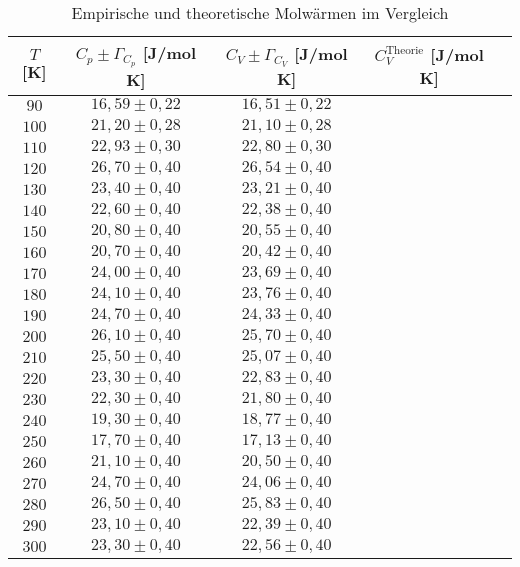 \begin{table}[H]
  \centering
  \begin{tabular}{ccccc}
    \toprule
    $T$ [K] & $C_p \pm \Gamma_{C_p} $ [J/mol K]
    & $C_V \pm \Gamma_{C_V} $ [J/mol K] & $C_{V}^{\text{Theorie}}$ [J/mol K] \\
    \midrule
    $ 90$ & $16,59 \pm 0,22$ & $16,51 \pm 0,22$ &  \\
    $100$ & $21,20 \pm 0,28$ & $21,10 \pm 0,28$ &  \\
    $110$ & $22,93 \pm 0,30$ & $22,80 \pm 0,30$ &  \\
    $120$ & $26,70 \pm 0,40$ & $26,54 \pm 0,40$ &  \\
    $130$ & $23,40 \pm 0,40$ & $23,21 \pm 0,40$ &  \\
    $140$ & $22,60 \pm 0,40$ & $22,38 \pm 0,40$ &  \\
    $150$ & $20,80 \pm 0,40$ & $20,55 \pm 0,40$ &  \\
    $160$ & $20,70 \pm 0,40$ & $20,42 \pm 0,40$ &  \\
    $170$ & $24,00 \pm 0,40$ & $23,69 \pm 0,40$ &  \\
    $180$ & $24,10 \pm 0,40$ & $23,76 \pm 0,40$ &  \\
    $190$ & $24,70 \pm 0,40$ & $24,33 \pm 0,40$ &  \\
    $200$ & $26,10 \pm 0,40$ & $25,70 \pm 0,40$ &  \\
    $210$ & $25,50 \pm 0,40$ & $25,07 \pm 0,40$ &  \\
    $220$ & $23,30 \pm 0,40$ & $22,83 \pm 0,40$ &  \\
    $230$ & $22,30 \pm 0,40$ & $21,80 \pm 0,40$ &  \\
    $240$ & $19,30 \pm 0,40$ & $18,77 \pm 0,40$ &  \\
    $250$ & $17,70 \pm 0,40$ & $17,13 \pm 0,40$ &  \\
    $260$ & $21,10 \pm 0,40$ & $20,50 \pm 0,40$ &  \\
    $270$ & $24,70 \pm 0,40$ & $24,06 \pm 0,40$ &  \\
    $280$ & $26,50 \pm 0,40$ & $25,83 \pm 0,40$ &  \\
    $290$ & $23,10 \pm 0,40$ & $22,39 \pm 0,40$ &  \\
    $300$ & $23,30 \pm 0,40$ & $22,56 \pm 0,40$ &  \\
    \bottomrule
  \end{tabular}
  \caption{Empirische und theoretische Molwärmen im Vergleich}
  \label{tab:2}
\end{table}
